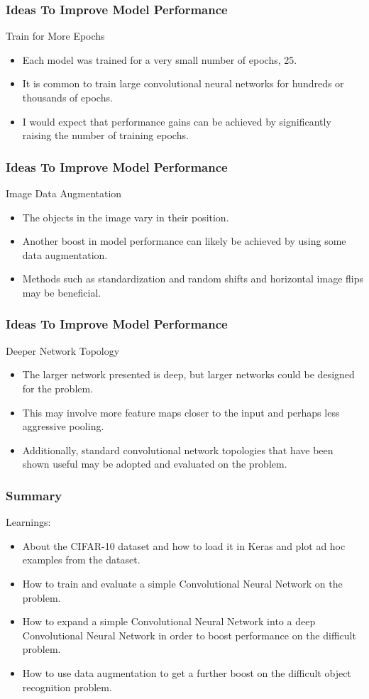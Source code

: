 \begin{frame}[fragile] \frametitle{Ideas To Improve Model Performance}
Train for More Epochs
\begin{itemize}
\item Each model was trained for a very small number of epochs, 25. 
\item It is common to train large convolutional neural networks for hundreds or thousands of epochs. 
\item I would expect that performance gains can be achieved by significantly raising the number of training epochs.
\end{itemize}
\end{frame}

\begin{frame}[fragile] \frametitle{Ideas To Improve Model Performance}
Image Data Augmentation
\begin{itemize}
\item The objects in the image vary in their position. 
\item Another boost in model performance can likely be achieved by using some data augmentation.
\item Methods such as standardization and random shifts and horizontal image flips may be beneficial.
\end{itemize}
\end{frame}

\begin{frame}[fragile] \frametitle{Ideas To Improve Model Performance}
Deeper Network Topology
\begin{itemize}
\item The larger network presented is deep, but larger networks could be designed for the problem. 
\item This may involve more feature maps closer to the input and perhaps less aggressive pooling. 
\item Additionally, standard convolutional network topologies that have been shown useful may be adopted and evaluated on the problem.
\end{itemize}
\end{frame}

\begin{frame}[fragile] \frametitle{Summary}
Learnings:
\begin{itemize}
\item About the CIFAR-10 dataset and how to load it in Keras and plot ad hoc examples from the dataset.
\item How to train and evaluate a simple Convolutional Neural Network on the problem.
\item How to expand a simple Convolutional Neural Network into a deep Convolutional Neural Network in order to boost performance on the difficult problem.
\item How to use data augmentation to get a further boost on the difficult object recognition problem.
\end{itemize}
\end{frame}

